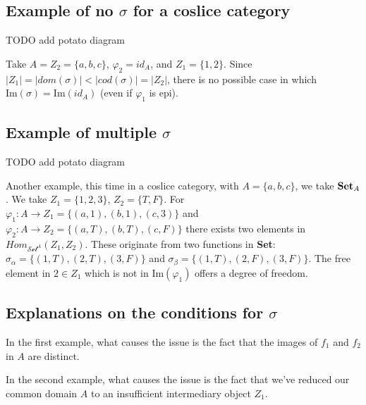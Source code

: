 

\subsection*{Example of no $\sigma$ for a coslice category}

TODO add potato diagram

Take $A = Z_2 = \{ a, b, c \}$, $\varphi_2 = id_A$, and $Z_1 = \{ 1, 2 \}$. Since $|Z_1| = |dom(\sigma)| < |cod(\sigma)| = |Z_2|$, there is no possible case in which $\text{Im} (\sigma) = \text{Im} (id_A)$ (even if $\varphi_1$ is epi).


\subsection*{Example of multiple $\sigma$}

TODO add potato diagram

Another example, this time in a coslice category, with $A = \{ a, b, c \}$, we take $\text{\textbf{Set}}_A$. We take $Z_1 = \{ 1, 2, 3 \}$, $Z_2 = \{T, F\}$. For $\varphi_1 : A \to Z_1 = \{(a, 1), (b, 1), (c, 3)\}$ and $\varphi_2 : A \to Z_2 = \{(a, T), (b, T), (c, F)\}$ there exists two elements in $Hom_{\mathcal{Set}^A} (Z_1, Z_2)$. These originate from two functions in \textbf{Set}: $\sigma_\alpha = \{ (1, T), (2, T), (3, F) \}$ and $\sigma_\beta = \{ (1, T), (2, F), (3, F) \}$. The free element in $2 \in Z_1$ which is not in $\text{Im} (\varphi_1)$ offers a degree of freedom.


\subsection*{Explanations on the conditions for $\sigma$}

In the first example, what causes the issue is the fact that the images of $f_1$ and $f_2$ in $A$ are distinct.

In the second example, what causes the issue is the fact that we've reduced our common domain $A$ to an insufficient intermediary object $Z_1$. 

